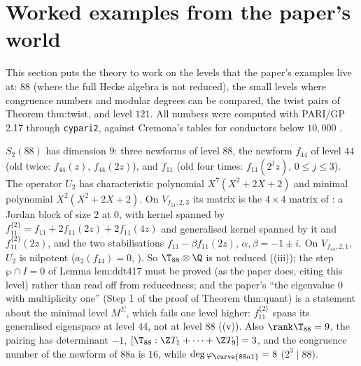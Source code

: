 \section{Worked examples from the paper's world}\label{sec:hecke:examples}

This section puts the theory to work on the levels that the paper's examples live at: $88$ (where the full Hecke algebra is not reduced), the small levels where congruence
numbers and modular degrees can be compared, the twist pairs of Theorem thm:twist, and level $121$. All numbers were computed with PARI/GP 2.17 through \texttt{cypari2}, against
Cremona's tables for conductors below $10{,}000$ \cite{Cremona97}.

\begin{example}[level $88$]\label{ex:hecke:level-88}
$S_2(88)$ has dimension $9$: three newforms of level $88$, the newform $f_{44}$ of level $44$ (old twice: $f_{44}(z)$, $f_{44}(2z)$), and $f_{11}$ (old four times: $f_{11}(2^jz)$, $0\le j\le3$). The operator $U_2$
has characteristic polynomial $X^7(X^2+2X+2)$ and minimal polynomial $X^2(X^2+2X+2)$. On $V_{f_{11},2,3}$ its matrix is the $4\times4$ matrix of : a Jordan block of size
$2$ at $0$, with kernel spanned by $f_{11}^{\{2\}}=f_{11}+2f_{11}(2z)+2f_{11}(4z)$ and generalised kernel spanned by it and $f_{11}^{\{2\}}(2z)$, and the two stabilisations $f_{11}-\beta f_{11}(2z)$,
$\alpha,\beta=-1\pm i$. On $V_{f_{44},2,1}$, $U_2$ is nilpotent ($a_2(f_{44})=0$, ). So $\T_{88}\otimes\Q$ is not reduced ((iii)); the step $\wp\cap I=0$ of
Lemma lem:ddt417 must be proved (as the paper does, citing this level) rather than read off from reducedness; and the paper's ``the eigenvalue $0$ with multiplicity one'' (Step 1 of the proof of
Theorem thm:quant) is a statement about the minimal level $M^\Sigma$, which fails one level higher: $f_{11}^{\{2\}}$ spans its generalised eigenspace at level $44$, not at level $88$
((v)). Also $\rank\T_{88}=9$, the pairing has determinant $-1$, $[\T_{88}:\Z T_1+\cdots+\Z T_9]=3$, and the congruence number of the newform of 88a is $16$, while
$\deg\varphi_{\curve{88a1}}=8$ ($2^3\mid88$).
\end{example}

